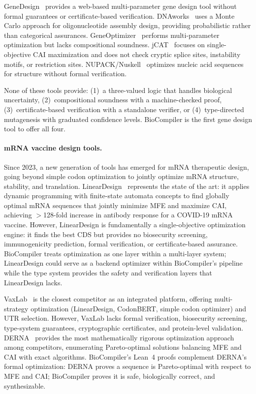 GeneDesign~\cite{richardson2006genedesign} provides a web-based
multi-parameter gene design tool without formal guarantees or
certificate-based verification.  DNAworks~\cite{vandenbergh2015dnaworks}
uses a Monte Carlo approach for oligonucleotide assembly design,
providing probabilistic rather than categorical assurances.
GeneOptimizer~\cite{fath2011geneoptimizer} performs multi-parameter
optimization but lacks compositional soundness.
jCAT~\cite{gage2006jcat} focuses on single-objective CAI maximization
and does not check cryptic splice sites, instability motifs, or
restriction sites.  NUPACK/Nuskell~\cite{zadeh2011nupack} optimizes
nucleic acid sequences for structure without formal verification.

None of these tools provide: (1)~a three-valued logic that handles
biological uncertainty, (2)~compositional soundness with a machine-checked
proof, (3)~certificate-based verification with a standalone verifier, or
(4)~type-directed mutagenesis with graduated confidence levels.
BioCompiler is the first gene design tool to offer all four.

\paragraph{mRNA vaccine design tools.}
Since 2023, a new generation of tools has emerged for mRNA therapeutic
design, going beyond simple codon optimization to jointly optimize mRNA
structure, stability, and translation.  LinearDesign~\cite{zhang2023lineardesign}
represents the state of the art: it applies dynamic programming with
finite-state automata concepts to find globally optimal mRNA sequences
that jointly minimize MFE and maximize CAI, achieving $>$128-fold
increase in antibody response for a COVID-19 mRNA vaccine.  However,
LinearDesign is fundamentally a single-objective optimization engine:
it finds the best CDS but provides no biosecurity screening,
immunogenicity prediction, formal verification, or certificate-based
assurance.  BioCompiler treats optimization as one layer within a
multi-layer system; LinearDesign could serve as a backend optimizer
within BioCompiler's pipeline while the type system provides the safety
and verification layers that LinearDesign lacks.

VaxLab~\cite{vaxlab2026} is the closest competitor as an integrated
platform, offering multi-strategy optimization (LinearDesign, CodonBERT,
simple codon optimizer) and UTR selection.  However, VaxLab lacks
formal verification, biosecurity screening, type-system guarantees,
cryptographic certificates, and protein-level validation.
DERNA~\cite{derna2024} provides the most mathematically rigorous
optimization approach among competitors, enumerating Pareto-optimal
solutions balancing MFE and CAI with exact algorithms.  BioCompiler's
Lean~4 proofs complement DERNA's formal optimization: DERNA proves a
sequence is Pareto-optimal with respect to MFE and CAI; BioCompiler
proves it is safe, biologically correct, and synthesizable.

